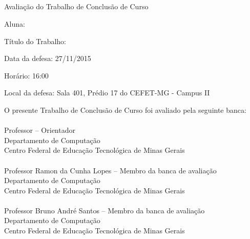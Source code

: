 \begin{center}
\textbf{\imprimirinstituicao}\\~\\
\imprimirprograma\\~\\
Avaliação do Trabalho de Conclusão de Curso
\end{center}

\hfill \break
\hfill \break
\noindent Aluna: \imprimirautor

\noindent Título do Trabalho: \imprimirtitulo

\noindent Data da defesa: 27/11/2015

\noindent Horário: 16:00

\noindent Local da defesa: Sala 401, Prédio 17 do CEFET-MG - Campus II
\hfill \break
\newline
\begin{center}
O  presente Trabalho de Conclusão de Curso foi avaliado pela seguinte banca:\\~\\

Professor \imprimirorientador  -- Orientador\\
Departamento de Computação \\
Centro Federal de Educação Tecnológica de Minas Gerais\\~\\

Professor Ramon da Cunha Lopes -- Membro da banca de avaliação \\
Departamento de Computação \\
Centro Federal de Educação Tecnológica de Minas Gerais \\~\\

Professor Bruno André Santos -- Membro da banca de avaliação \\
Departamento de Computação \\
Centro Federal de Educação Tecnológica de Minas Gerais \\~\\

\end{center}